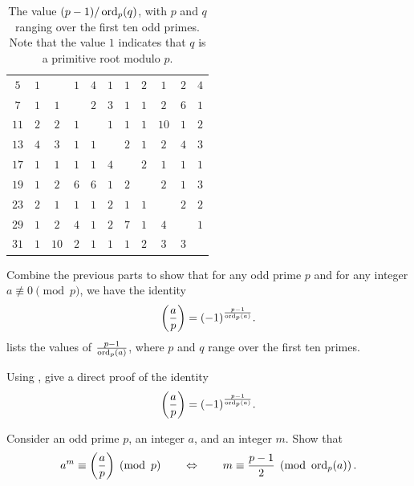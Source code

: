\begin{routine}
\begin{subexenum}
\begin{table}
\begin{tabular}{c|cccccccccc}
      $5$ & $1$ & \text{-} & $1$ & $4$ & $1$ & $1$ & $2$ & $1$ & $2$ & $4$ \\
      $7$ & $1$ & $1$ & \text{-} & $2$ & $3$ & $1$ & $1$ & $2$ & $6$ & $1$ \\
      $11$ & $2$ & $2$ & $1$ & \text{-} & $1$ & $1$ & $1$ & $10$ & $1$ & $2$ \\
      $13$ & $4$ & $3$ & $1$ & $1$ & \text{-} & $2$ & $1$ & $2$ & $4$ & $3$ \\
      $17$ & $1$ & $1$ & $1$ & $1$ & $4$ & \text{-} & $2$ & $1$ & $1$ & $1$ \\
      $19$ & $1$ & $2$ & $6$ & $6$ & $1$ & $2$ & \text{-} & $2$ & $1$ & $3$ \\
      $23$ & $2$ & $1$ & $1$ & $1$ & $2$ & $1$ & $1$ & \text{-} & $2$ & $2$ \\
      $29$ & $1$ & $2$ & $4$ & $1$ & $2$ & $7$ & $1$ & $4$ & \text{-} & $1$ \\
      $31$ & $1$ & $10$ & $2$ & $1$ & $1$ & $1$ & $2$ & $3$ & $3$ & \text{-} \\
      \bottomrule
    \end{tabular}
    \caption[Universal exponents]{The value $(p-1)/\operatorname{ord}_p(q)$, with $p$ and $q$ ranging over the first ten odd primes. Note that the value $1$ indicates that $q$ is a primitive root modulo $p$.}
    \label{table:universal-exponents}
  \end{table}
  Combine the previous parts to show that for any odd prime $p$ and for any integer $a\nequiv 0\pmod{p}$, we have the identity
    \begin{equation*}
      \legendre{a}{p}=(-1)^{\frac{p-1}{\ord_p(a)}}.
    \end{equation*}
     lists the values of $\frac{p-1}{\operatorname{ord}_p(a)}$, where $p$ and $q$ range over the first ten primes.
  \item Using , give a direct proof of the identity
    \begin{equation*}
      \legendre{a}{p}=(-1)^{\frac{p-1}{\ord_p(a)}}.
    \end{equation*}
  \end{subexenum}
  \exercise Consider an odd prime $p$, an integer $a$, and an integer $m$. Show that
  \begin{equation*}
    a^m\equiv \legendre{a}{p}\pmod{p}\qquad\Leftrightarrow\qquad m\equiv\frac{p-1}{2}\pmod{\ord_p(a)}.
  \end{equation*}
\end{routine}

